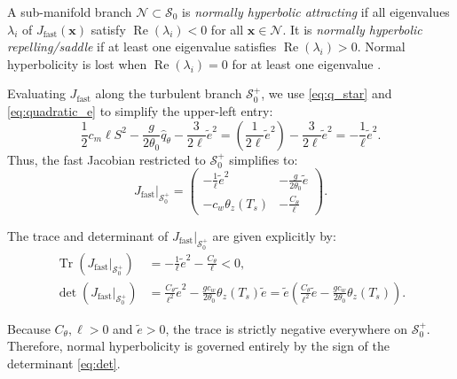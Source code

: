 \begin{definition}
A sub-manifold branch $\mathcal{N} \subset \mathcal{S}_0$ is \emph{normally hyperbolic attracting} if all eigenvalues $\lambda_i$ of $J_{\mathrm{fast}}(\mathbf{x})$ satisfy $\operatorname{Re}(\lambda_i) < 0$ for all $\mathbf{x} \in \mathcal{N}$. It is \emph{normally hyperbolic repelling/saddle} if at least one eigenvalue satisfies $\operatorname{Re}(\lambda_i) > 0$. Normal hyperbolicity is lost when $\operatorname{Re}(\lambda_i) = 0$ for at least one eigenvalue \citep{Fenichel1979}.
\end{definition}

Evaluating $J_{\mathrm{fast}}$ along the turbulent branch $\mathcal{S}_0^+$, we use \eqref{eq:q_star} and \eqref{eq:quadratic_e} to simplify the upper-left entry:
\begin{equation}
\frac{1}{2} c_m \ell S^2 - \frac{g}{2\theta_0} \hat q_\theta - \frac{3}{2\ell} \tilde e^2 = \left( \frac{1}{2\ell} \tilde e^2 \right) - \frac{3}{2\ell} \tilde e^2 = -\frac{1}{\ell} \tilde e^2.
\end{equation}
Thus, the fast Jacobian restricted to $\mathcal{S}_0^+$ simplifies to:
\begin{equation}
\left. J_{\mathrm{fast}} \right|_{\mathcal{S}_0^+} =
\begin{pmatrix}
-\frac{1}{\ell} \tilde e^2 & -\frac{g}{2\theta_0} \tilde e \\[6pt]
-c_w \theta_z(T_s) & -\frac{C_\theta}{\ell}
\end{pmatrix}.
\label{eq:J_restricted}
\end{equation}

The trace and determinant of $\left. J_{\mathrm{fast}} \right|_{\mathcal{S}_0^+}$ are given explicitly by:
\begin{align}
\operatorname{Tr}\left(\left. J_{\mathrm{fast}} \right|_{\mathcal{S}_0^+}\right) &= -\frac{1}{\ell} \tilde e^2 - \frac{C_\theta}{\ell} < 0, \label{eq:trace} \\
\det\left(\left. J_{\mathrm{fast}} \right|_{\mathcal{S}_0^+}\right) &= \frac{C_\theta}{\ell^2} \tilde e^2 - \frac{g c_w}{2\theta_0} \theta_z(T_s) \tilde e = \tilde e \left( \frac{C_\theta}{\ell^2} \tilde e - \frac{g c_w}{2\theta_0} \theta_z(T_s) \right). \label{eq:det}
\end{align}

Because $C_\theta, \ell > 0$ and $\tilde e > 0$, the trace is strictly negative everywhere on $\mathcal{S}_0^+$. Therefore, normal hyperbolicity is governed entirely by the sign of the determinant \eqref{eq:det}.

